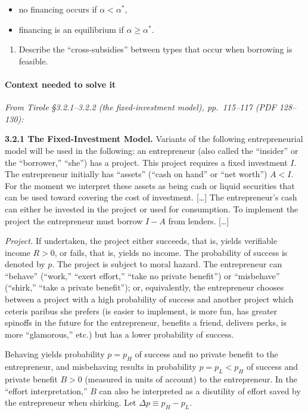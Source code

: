 \documentclass[11pt,a4paper]{article}
\providecommand{\tightlist}{\setlength{\itemsep}{0pt}\setlength{\parskip}{0pt}}
\begin{document}
\begin{itemize}
\tightlist
\item
  no financing occurs if \(\alpha < \alpha^*\),
\item
  financing is an equilibrium if \(\alpha \geqslant \alpha^*\).
\end{itemize}

\begin{enumerate}
\def\labelenumi{(\roman{enumi})}
\setcounter{enumi}{2}
\tightlist
\item
  Describe the ``cross-subsidies'' between types that occur when borrowing is feasible.
\end{enumerate}

\paragraph{Context needed to solve it}

\emph{From Tirole §3.2.1--3.2.2 (the fixed-investment model), pp.~115--117 (PDF 128--130):}

\textbf{3.2.1 The Fixed-Investment Model.} Variants of the following entrepreneurial model will be
used in the following: an entrepreneur (also called the ``insider'' or the ``borrower,'' ``she'')
has a project. This project requires a fixed investment \(I\). The entrepreneur initially has
``assets'' (``cash on hand'' or ``net worth'') \(A < I\). For the moment we interpret these assets
as being cash or liquid securities that can be used toward covering the cost of investment.
{[}\ldots{]} The entrepreneur's cash can either be invested in the project or used for consumption.
To implement the project the entrepreneur must borrow \(I - A\) from lenders. {[}\ldots{]}

\emph{Project.} If undertaken, the project either succeeds, that is, yields verifiable income
\(R > 0\), or fails, that is, yields no income. The probability of success is denoted by \(p\). The
project is subject to moral hazard. The entrepreneur can ``behave'' (``work,'' ``exert effort,''
``take no private benefit'') or ``misbehave'' (``shirk,'' ``take a private benefit''); or,
equivalently, the entrepreneur chooses between a project with a high probability of success and
another project which ceteris paribus she prefers (is easier to implement, is more fun, has greater
spinoffs in the future for the entrepreneur, benefits a friend, delivers perks, is more
``glamorous,'' etc.) but has a lower probability of success.

Behaving yields probability \(p = p_H\) of success and no private benefit to the entrepreneur, and
misbehaving results in probability \(p = p_L < p_H\) of success and private benefit \(B > 0\)
(measured in units of account) to the entrepreneur. In the ``effort interpretation,'' \(B\) can also
be interpreted as a disutility of effort saved by the entrepreneur when shirking. Let
\(\Delta p \equiv p_H - p_L\).
\end{document}
